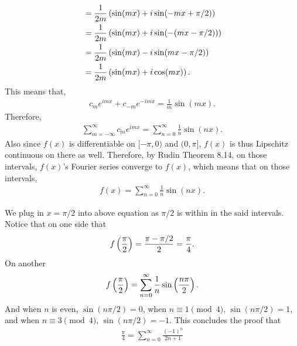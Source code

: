 \documentclass[12pt]{article}
\begin{document}
\begin{fproof}[3(a)]
\begin{align*}
   &=\frac{1}{2m} \left( \sin(mx) + i\sin(-mx + \pi/2) \right)\\
   &= \frac{1}{2m} \left( \sin(mx) + i\sin(-(mx - \pi/2)) \right)\\
   &=\frac{1}{2m} \left( \sin(mx) - i\sin(mx - \pi/2) \right)\\
   &=\frac{1}{2m} \left( \sin(mx) + i\cos(mx) \right).
 \end{align*}
 This means that,
 \begin{align*}
   c_m e^{imx} + c_{-m}e^{-imx} = \frac{1}{m} \sin(mx).
 \end{align*}
 Therefore,
 \begin{align*}
   \sum_{m = -\infty}^{\infty} c_m e^{imx} = \sum_{n=0}^{\infty} \frac{1}{n} \sin(nx).
 \end{align*}
 Also since \(f(x)\) is differentiable on \([-\pi, 0)\) and \((0, \pi]\), \(f(x)\) is thus Lipschitz continuous on there as well.
 Therefore, by Rudin Theorem 8.14, on those intervals, \(f(x)\)'s Fourier series converge to \(f(x)\), which means that on those intervals,
 \begin{align*}
   f(x) = \sum_{n=0}^{\infty} \frac{1}{n} \sin(nx).
 \end{align*}

\end{fproof}

\begin{fproof}[3(b)]
 We plug in \(x = \pi/2\) into above equation as \(\pi/2\) is within in the said intervals.
 Notice that on one side that
 \begin{align*}
   f\left( \frac{\pi}{2} \right) = \frac{\pi - \pi/2}{2} = \frac{\pi}{4}.
 \end{align*}
 On another 
 \begin{align*}
   f \left( \frac{\pi}{2} \right) = \sum_{n=0}^{\infty} \frac{1}{n} \sin \left( \frac{n \pi}{2} \right).
 \end{align*}
 And when \(n\) is even, \(\sin(n\pi/2) = 0\), when \(n \equiv 1 \pmod 4\), \(\sin(n\pi/2) = 1\), and when \(n \equiv 3 \pmod 4\), \(\sin(n\pi/2) = -1\).
 This concludes the proof that
 \begin{align*}
   \frac{\pi}{4} = \sum_{n=0}^{\infty} \frac{(-1)^n}{2n+1}
 \end{align*}
\end{fproof}

\begin{fproof}[3(c)]
 
\end{fproof}
\newpage
\end{document}
